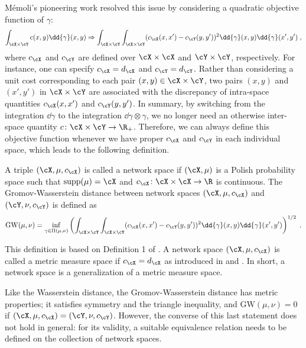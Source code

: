 \documentclass[11pt]{article}
\begin{document}
M{\'e}moli's pioneering work \cite{memoli_2011} resolved this issue by considering a quadratic objective function of $\gamma$:
\begin{equation*}
	\int_{\cX \times \cY} c(x, y) \dd{\gamma}(x, y) \Rightarrow \int_{\cX \times \cY}\int_{\cX \times \cY} (c_{\cX}(x, x') - c_{\cY}(y, y'))^2 \dd{\gamma}(x, y) \dd{\gamma}(x', y') \;,
\end{equation*}
where $c_{\cX}$ and $c_{\cY}$ are defined over $\cX \times \cX$ and $\cY \times \cY$, respectively. For instance, one can specify $c_{\cX} = d_{\cX}$ and $c_{\cY} = d_{\cY}$. Rather than considering a unit cost corresponding to each pair $(x, y) \in \cX \times \cY$, two pairs $(x, y)$ and $(x', y')$ in $\cX \times \cY$ are associated with the discrepancy of intra-space quantities $c_{\cX}(x, x')$ and $c_{\cY}(y, y')$. In summary, by switching from the integration $\dd{\gamma}$ to the integration $\dd{\gamma \otimes \gamma}$, we no longer need an otherwise inter-space quantity $c \colon \cX \times \cY \to \R_+$. Therefore, we can always define this objective function whenever we have proper $c_{\cX}$ and $c_{\cY}$ in each individual space, which leads to the following definition.

\begin{definition}
	\label{def:mms}
	A triple $(\cX, \mu, c_{\cX})$ is called a network space if $(\cX, \mu)$ is a Polish probability space such that $\mathrm{supp}(\mu) = \cX$ and $c_{\cX} \colon \cX \times \cX \to \R$ is continuous. The Gromov-Wasserstein distance between network spaces $(\cX, \mu, c_{\cX})$ and $(\cY, \nu, c_{\cY})$ is defined as
	\begin{equation*}
		\mathrm{GW}(\mu, \nu) = \inf_{\gamma \in \Pi(\mu, \nu)} \left( \int_{\cX \times \cY} \int_{\cX \times \cY} (c_{\cX}(x, x') - c_{\cY}(y, y'))^2 \dd{\gamma}(x, y) \dd{\gamma}(x', y') \right)^{1/2}\;.
	\end{equation*}
\end{definition}

\begin{remark} \rm
	This definition is based on Definition 1 of \cite{chowdhury_memoli_2019}. A network space $(\cX, \mu, c_{\cX})$ is called a metric measure space if $c_{\cX} = d_{\cX}$ as introduced in \cite{memoli_2011} and \cite{sturm_2012}. In short, a network space is a generalization of a metric measure space.
\end{remark}

Like the Wasserstein distance, the Gromov-Wasserstein distance has metric properties; it satisfies symmetry and the triangle inequality, and $\mathrm{GW}(\mu, \nu) = 0$ if $(\cX, \mu, c_{\cX}) = (\cY, \nu, c_{\cY})$. However, the converse of this last statement does not hold in general: for its validity, a suitable equivalence relation needs to be defined on the collection of network spaces.
\end{document}
